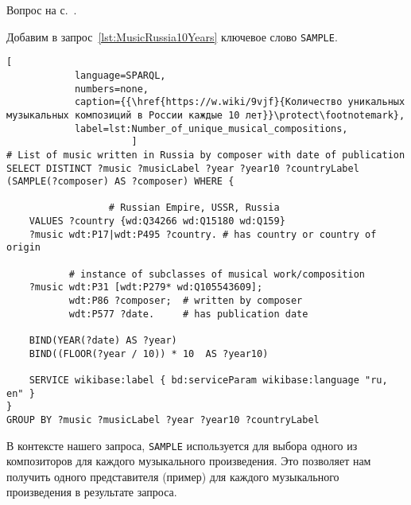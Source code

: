 \newpage
\begin{task}
    \AnswerBackref Вопрос на с.~\pageref{question:music_unique}.
    \label{answer:music_unique_answ}

   Добавим в запрос~\ref{lst:MusicRussia10Years} ключевое слово \lstinline|SAMPLE|.
    \begin{lstlisting}[ 
            language=SPARQL, 
            numbers=none, 
            caption={{\href{https://w.wiki/9vjf}{Количество уникальных музыкальных композиций в России каждые 10 лет}}\protect\footnotemark}, 
            label=lst:Number_of_unique_musical_compositions, 
                      ]
# List of music written in Russia by composer with date of publication
SELECT DISTINCT ?music ?musicLabel ?year ?year10 ?countryLabel (SAMPLE(?composer) AS ?composer) WHERE {
    
                  # Russian Empire, USSR, Russia
    VALUES ?country {wd:Q34266 wd:Q15180 wd:Q159}
    ?music wdt:P17|wdt:P495 ?country. # has country or country of origin  
    
           # instance of subclasses of musical work/composition
    ?music wdt:P31 [wdt:P279* wd:Q105543609];
           wdt:P86 ?composer;  # written by composer
           wdt:P577 ?date.     # has publication date
    
    BIND(YEAR(?date) AS ?year)
    BIND((FLOOR(?year / 10)) * 10  AS ?year10)
    
    SERVICE wikibase:label { bd:serviceParam wikibase:language "ru, en" }
}
GROUP BY ?music ?musicLabel ?year ?year10 ?countryLabel
\end{lstlisting}
    
В контексте нашего запроса, \lstinline|SAMPLE| используется для выбора одного из композиторов для каждого музыкального произведения. 
Это позволяет нам получить одного представителя (пример) для каждого музыкального произведения в результате запроса.

\end{task}

